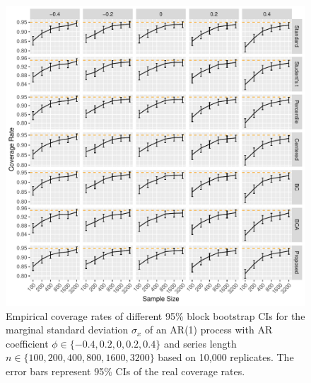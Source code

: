 \documentclass[12pt, letterpaper, titlepage]{article}
\begin{document}
\begin{figure}[tbp]
  \centering
  \includegraphics[width=\textwidth]{figures/plot_sigma}
  \caption{Empirical coverage rates of different 95\% block bootstrap CIs for
    the marginal standard deviation $\sigma_x$ of an AR(1) 
		process with AR
    coefficient $\phi \in \{-0.4, 0.2, 0, 0.2, 0.4\}$ and series length
    $n \in \{100, 200, 400, 800, 1600, 3200\}$ based on 10,000 replicates.
    The error bars represent 95\% CIs of the real coverage rates.}
  \label{fig:sigma}
\end{figure}
\end{document}
